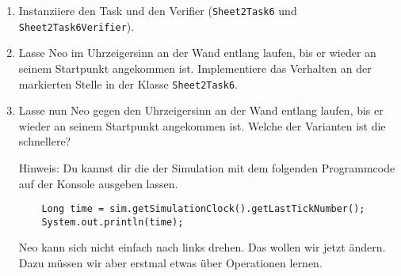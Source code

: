 

\begin{enumerate}
    \item Instanziiere den Task und den Verifier (\lstinline{Sheet2Task6} und \lstinline{Sheet2Task6Verifier}).
    \item Lasse Neo im Uhrzeigersinn an der Wand entlang laufen, bis er wieder an seinem Startpunkt angekommen ist.
        Implementiere das Verhalten an der markierten Stelle in der Klasse \lstinline{Sheet2Task6}.
    \item Lasse nun Neo gegen den Uhrzeigersinn an der Wand entlang laufen, bis er wieder an seinem Startpunkt angekommen ist.
        Welche der Varianten ist die schnellere?

        Hinweis: Du kannst dir die  der Simulation mit dem folgenden Programmcode auf der Konsole ausgeben lassen.

        \begin{lstlisting}
    Long time = sim.getSimulationClock().getLastTickNumber();
    System.out.println(time);
        \end{lstlisting}

        Neo kann sich nicht einfach nach links drehen.
        Das wollen wir jetzt ändern.
        Dazu müssen wir aber erstmal etwas über Operationen lernen.
\end{enumerate}


